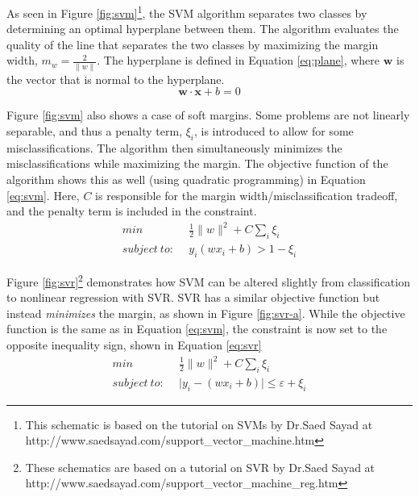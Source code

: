 As seen in Figure \ref{fig:svm}\footnote{This schematic is based on the
tutorial on SVMs by Dr.\@ Saed Sayad at
http://www.saedsayad.com/support\_vector\_machine.htm}, the \gls{SVM} algorithm
separates two classes by determining an optimal hyperplane between them.  The
algorithm evaluates the quality of the line that separates the two classes by
maximizing the margin width, $m_w = \frac{2}{\lVert w \rVert}$.  The hyperplane
is defined in Equation \ref{eq:plane}, where $\boldsymbol{w}$ is the vector
that is normal to the hyperplane.  
\begin{equation}
  \boldsymbol{w \cdot x} + b = 0
  \label{eq:plane}
\end{equation}

Figure \ref{fig:svm} also shows a case of soft margins.  Some problems are not
linearly separable, and thus a penalty term, $\xi_{i}$, is introduced to allow
for some misclassifications.  The algorithm then simultaneously minimizes the
misclassifications while maximizing the margin. The objective function of the
algorithm shows this as well (using quadratic programming) in Equation
\ref{eq:svm}. Here, $C$ is responsible for the margin width/misclassification
tradeoff, and the penalty term is included in the constraint. \cite{scikit,
elements_stats}
\begin{equation}
\begin{split}
  min\ & \frac{1}{2} \lVert w \rVert ^{2} + C \sum_{i} \xi_i \\
  subject\ to:\ \ & y_i (w x_i + b) > 1 - \xi_i
  \label{eq:svm}
\end{split}
\end{equation}

Figure \ref{fig:svr}\footnote{These schematics are based on a tutorial on SVR
by Dr.\@ Saed Sayad at
http://www.saedsayad.com/support\_vector\_machine\_reg.htm} demonstrates how
\gls{SVM} can be altered slightly from classification to nonlinear regression
with \gls{SVR}.  \Gls{SVR} has a similar objective function but instead
\textit{minimizes} the margin, as shown in Figure \ref{fig:svr-a}.  While the
objective function is the same as in Equation \ref{eq:svm}, the constraint is
now set to the opposite inequality sign, shown in Equation \ref{eq:svr} 
\begin{equation}
\begin{split}
  min\ & \frac{1}{2} \lVert w \rVert ^{2} + C \sum_{i} \xi_{i} \\
  subject\ to:\ \ & \lvert y_i - (w x_i + b) \rvert \leq \varepsilon + \xi_i
  \label{eq:svr}
\end{split}
\end{equation} 

